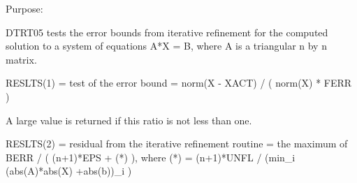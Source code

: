 \begin{DoxyParagraph}{Purpose\+: }
\begin{DoxyVerb} DTRT05 tests the error bounds from iterative refinement for the
 computed solution to a system of equations A*X = B, where A is a
 triangular n by n matrix.

 RESLTS(1) = test of the error bound
           = norm(X - XACT) / ( norm(X) * FERR )

 A large value is returned if this ratio is not less than one.

 RESLTS(2) = residual from the iterative refinement routine
           = the maximum of BERR / ( (n+1)*EPS + (*) ), where
             (*) = (n+1)*UNFL / (min_i (abs(A)*abs(X) +abs(b))_i )\end{DoxyVerb}
 
\end{DoxyParagraph}

